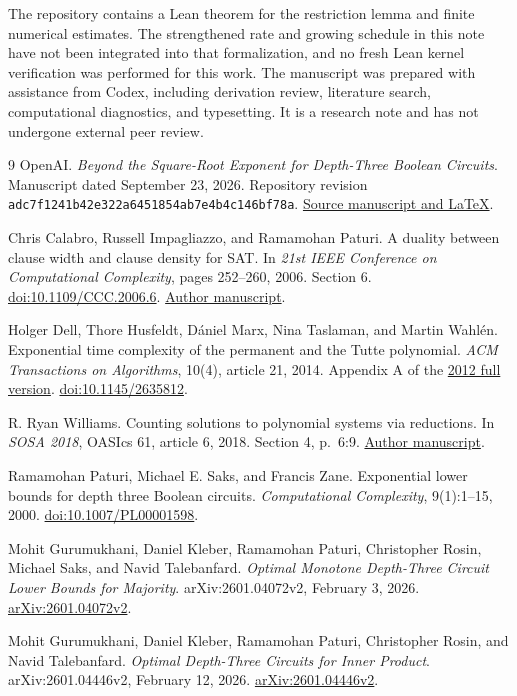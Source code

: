 \documentclass[11pt,letterpaper]{article}
\theoremstyle{definition}
\numberwithin{equation}{section}
\begin{document}
The repository contains a Lean theorem for the restriction lemma and
finite numerical estimates. The strengthened rate and growing schedule
in this note have not been integrated into that formalization, and no
fresh Lean kernel verification was performed for this work. The manuscript
was prepared with assistance from Codex, including derivation review,
literature search, computational diagnostics, and typesetting. It is a
research note and has not undergone external peer review.

\begin{thebibliography}{9}
OpenAI.
\emph{Beyond the Square-Root Exponent for Depth-Three Boolean Circuits}.
Manuscript dated September 23, 2026. Repository revision
\texttt{adc7f1241b42e322a6451854ab7e4b4c146bf78a}.
\href{https://github.com/openai/math/tree/adc7f1241b42e322a6451854ab7e4b4c146bf78a/preprints/Beyond-the-Square-Root-Exponent-for-Depth-Three-Boolean-Circuits-September-23-2026}{Source manuscript and LaTeX}.

Chris Calabro, Russell Impagliazzo, and Ramamohan Paturi.
A duality between clause width and clause density for SAT.
In \emph{21st IEEE Conference on Computational Complexity},
pages 252--260, 2006. Section 6.
\href{https://doi.org/10.1109/CCC.2006.6}{doi:10.1109/CCC.2006.6}.
\href{https://cseweb.ucsd.edu/~ccalabro/cip.pdf}{Author manuscript}.

Holger Dell, Thore Husfeldt, D\'aniel Marx, Nina Taslaman, and Martin Wahl\'en.
Exponential time complexity of the permanent and the Tutte polynomial.
\emph{ACM Transactions on Algorithms}, 10(4), article 21, 2014.
Appendix A of the \href{https://arxiv.org/abs/1206.1775v1}{2012 full version}.
\href{https://doi.org/10.1145/2635812}{doi:10.1145/2635812}.

R. Ryan Williams.
Counting solutions to polynomial systems via reductions.
In \emph{SOSA 2018}, OASIcs 61, article 6, 2018. Section 4, p.~6:9.
\href{https://people.csail.mit.edu/rrw/counting-sosa.pdf}{Author manuscript}.

Ramamohan Paturi, Michael E. Saks, and Francis Zane.
Exponential lower bounds for depth three Boolean circuits.
\emph{Computational Complexity}, 9(1):1--15, 2000.
\href{https://doi.org/10.1007/PL00001598}{doi:10.1007/PL00001598}.

Mohit Gurumukhani, Daniel Kleber, Ramamohan Paturi, Christopher Rosin,
Michael Saks, and Navid Talebanfard.
\emph{Optimal Monotone Depth-Three Circuit Lower Bounds for Majority}.
arXiv:2601.04072v2, February 3, 2026.
\href{https://arxiv.org/abs/2601.04072v2}{arXiv:2601.04072v2}.

Mohit Gurumukhani, Daniel Kleber, Ramamohan Paturi, Christopher Rosin,
and Navid Talebanfard.
\emph{Optimal Depth-Three Circuits for Inner Product}.
arXiv:2601.04446v2, February 12, 2026.
\href{https://arxiv.org/abs/2601.04446v2}{arXiv:2601.04446v2}.
\end{thebibliography}
\end{document}
